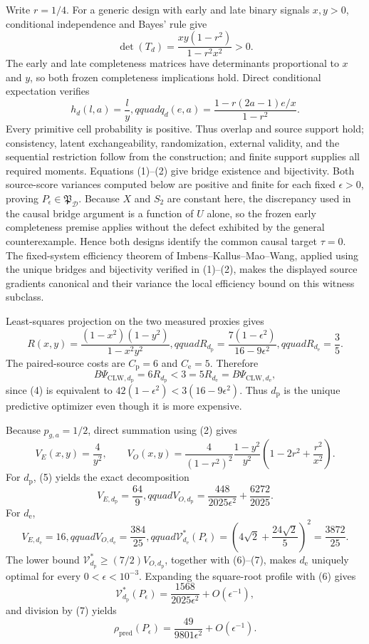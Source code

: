 Write \(r=1/4\).  For a generic design with early and late binary signals \(x,y>0\), conditional independence and Bayes' rule give
\[
 \det(T_d)=\frac{xy(1-r^2)}{1-r^2x^2}>0. \tag{1}
\]
The early and late completeness matrices have determinants proportional to \(x\) and \(y\), so both frozen completeness implications hold.  Direct conditional expectation verifies
\[
 h_d(l,a)=\frac l y,qquad
 q_d(e,a)=\frac{1-r(2a-1)e/x}{1-r^2}. \tag{2}
\]
Every primitive cell probability is positive.  Thus overlap and source support hold; consistency, latent exchangeability, randomization, external validity, and the sequential restriction follow from the construction; and finite support supplies all required moments.  Equations (1)--(2) give bridge existence and bijectivity.  Both source-score variances computed below are positive and finite for each fixed \(\epsilon>0\), proving \(P_\epsilon\in\mathfrak P_{\mathcal D}\).  Because \(X\) and \(S_2\) are constant here, the discrepancy used in the causal bridge argument is a function of \(U\) alone, so the frozen early completeness premise applies without the defect exhibited by the general counterexample.  Hence both designs identify the common causal target \(\tau=0\).  The fixed-system efficiency theorem of Imbens--Kallus--Mao--Wang, applied using the unique bridges and bijectivity verified in (1)--(2), makes the displayed source gradients canonical and their variance the local efficiency bound on this witness subclass.

Least-squares projection on the two measured proxies gives
\[
 R(x,y)=\frac{(1-x^2)(1-y^2)}{1-x^2y^2},qquad
 R_{d_{\mathrm p}}=\frac{7(1-\epsilon^2)}{16-9\epsilon^2},qquad
 R_{d_{\mathrm e}}=\frac35. \tag{3}
\]
The paired-source costs are \(C_{\mathrm p}=6\) and \(C_{\mathrm e}=5\).  Therefore
\[
 B\Psi_{\mathrm{CLW},d_{\mathrm p}}=6R_{d_{\mathrm p}}<3
 =5R_{d_{\mathrm e}}=B\Psi_{\mathrm{CLW},d_{\mathrm e}}, \tag{4}
\]
since (4) is equivalent to \(42(1-\epsilon^2)<3(16-9\epsilon^2)\).  Thus \(d_{\mathrm p}\) is the unique predictive optimizer even though it is more expensive.

Because \(p_{g,a}=1/2\), direct summation using (2) gives
\[
 V_E(x,y)=\frac4{y^2},\qquad
 V_O(x,y)=\frac4{(1-r^2)^2}\frac{1-y^2}{y^2}
 \left(1-2r^2+\frac{r^2}{x^2}\right). \tag{5}
\]
For \(d_{\mathrm p}\), (5) yields the exact decomposition
\[
 V_{E,d_{\mathrm p}}=\frac{64}{9},qquad
 V_{O,d_{\mathrm p}}=\frac{448}{2025\epsilon^2}+\frac{6272}{2025}. \tag{6}
\]
For \(d_{\mathrm e}\),
\[
 V_{E,d_{\mathrm e}}=16,qquad V_{O,d_{\mathrm e}}=\frac{384}{25},qquad
 \mathcal V_{d_{\mathrm e}}^*(P_\epsilon)
 =\left(4\sqrt2+\frac{24\sqrt2}{5}\right)^2=\frac{3872}{25}. \tag{7}
\]
The lower bound \(\mathcal V_{d_{\mathrm p}}^*\ge(7/2)V_{O,d_{\mathrm p}}\), together with (6)--(7), makes \(d_{\mathrm e}\) uniquely optimal for every \(0<\epsilon<10^{-3}\).  Expanding the square-root profile with (6) gives
\[
 \mathcal V_{d_{\mathrm p}}^*(P_\epsilon)
 =\frac{1568}{2025\epsilon^2}+O(\epsilon^{-1}),
\]
and division by (7) yields
\[
 \rho_{\mathrm{pred}}(P_\epsilon)
 =\frac{49}{9801\epsilon^2}+O(\epsilon^{-1}). \tag{8}
\]

